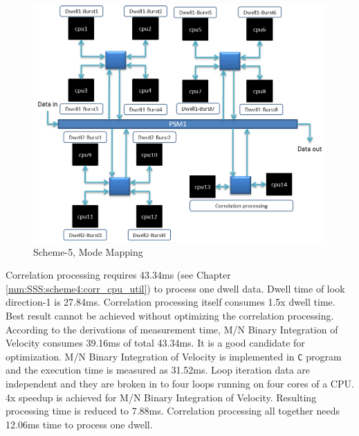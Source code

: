 \begin{figure}[h!]
	\centering
	\includegraphics[width=160mm]{figures/scheme5_mode_mapping}
	\caption{Scheme-5, Mode Mapping}
	\label{fig:mm:scheme5_mode_mapping}
\end{figure}

Correlation processing requires 43.34ms (see Chapter \ref{mm:SSS:scheme4:corr_cpu_util}) to process one dwell data. Dwell time of look direction-1 is 27.84ms. Correlation processing itself consumes 1.5x dwell time. Best result cannot be achieved without optimizing the correlation processing. According to the derivations of measurement time, M/N Binary Integration of Velocity consumes 39.16ms of total 43.34ms. It is a good candidate for optimization. M/N Binary Integration of Velocity is implemented in \verb|C| program and the execution time is measured as 31.52ms. Loop iteration data are independent and they are broken in to four loops running on four cores of a CPU. 4x speedup is achieved for M/N Binary Integration of Velocity. Resulting processing time is reduced to 7.88ms. Correlation processing all together needs 12.06ms time to process one dwell.

